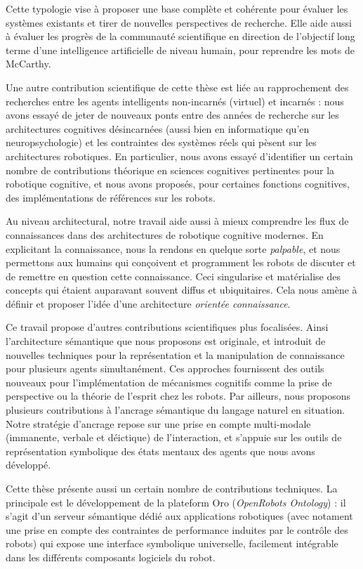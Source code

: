 Cette typologie vise à proposer une base complète et cohérente pour évaluer les
systèmes existants et tirer de nouvelles perspectives de recherche. Elle aide
aussi à évaluer les progrès de la communauté scientifique en direction de
l'objectif long terme d'une intelligence artificielle de niveau humain, pour
reprendre les mots de McCarthy.

Une autre contribution scientifique de cette thèse est liée au rapprochement
des recherches entre les agents intelligents non-incarnés (virtuel) et incarnés
: nous avons essayé de jeter de nouveaux ponts entre des années de recherche
sur les architectures cognitives désincarnées (aussi bien en informatique qu'en
neuropsychologie) et les contraintes des systèmes réels qui pèsent sur les
architectures robotiques. En particulier, nous avons essayé d'identifier un
certain nombre de contributions théorique en sciences cognitives pertinentes
pour la robotique cognitive, et nous avons proposés, pour certaines fonctions
cognitives, des implémentations de références sur les robots.

Au niveau architectural, notre travail aide aussi à mieux comprendre les flux
de connaissances dans des architectures de robotique cognitive modernes. En
explicitant la connaissance, nous la rendons en quelque sorte \emph{palpable},
et nous permettons aux humains qui conçoivent et programment les robots de
discuter et de remettre en question cette connaissance. Ceci singularise et
matérialise des concepts qui étaient auparavant souvent diffus et ubiquitaires.
Cela nous amène à définir et proposer l'idée d'une architecture \emph{orientée
connaissance}.

Ce travail propose d'autres contributions scientifiques plus focalisées. Ainsi
l'architecture sémantique que nous proposons est originale, et introduit de
nouvelles techniques pour la représentation et la manipulation de connaissance
pour plusieurs agents simultanément. Ces approches fournissent des outils
nouveaux pour l'implémentation de mécanismes cognitifs comme la prise de
perspective ou la théorie de l'esprit chez les robots. Par ailleurs, nous
proposons plusieurs contributions à l'ancrage sémantique du langage naturel en
situation. Notre stratégie d'ancrage repose sur une prise en compte
multi-modale (immanente, verbale et déictique) de l'interaction, et s'appuie
sur les outils de représentation symbolique des états mentaux des agents que
nous avons développé.

Cette thèse présente aussi un certain nombre de contributions techniques. La
principale est le développement de la plateform {\sc Oro} (\emph{OpenRobots
Ontology}) : il s'agit d'un serveur sémantique dédié aux applications
robotiques (avec notament une prise en compte des contraintes de performance
induites par le contrôle des robots) qui expose une interface symbolique
universelle, facilement intégrable dans les différents composants logiciels du
robot.

